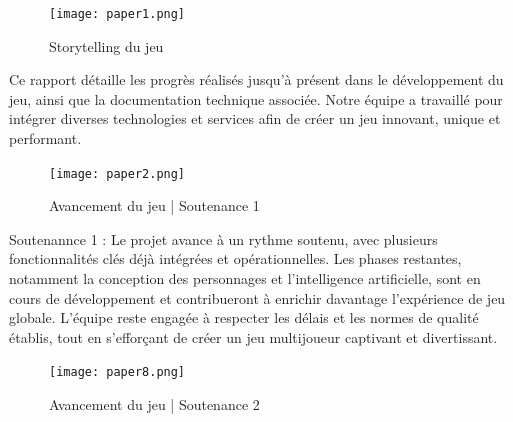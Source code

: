 \documentclass[
	article,			%
	11pt,				%
	oneside,			%
	a4paper,			%
	chapter=TITLE,
	french,			%
	sumario=tradicional
	]{base_nt}
\begin{document}

\frenchspacing 


%
%
\maketitle

\newpage
\vspace{0cm}
\begin{figure}[ht]
	\caption{Storytelling du jeu}
	\centering
	\texttt{[image: paper1.png]}
	
\end{figure}

Ce rapport détaille les progrès réalisés jusqu'à présent dans le développement du jeu, ainsi que la documentation technique associée. Notre équipe a travaillé pour intégrer diverses technologies et services afin de créer un jeu innovant, unique et performant.

\vspace{0cm}
\begin{figure}[ht]
	\caption{Avancement du jeu | Soutenance 1}
	\centering
	\texttt{[image: paper2.png]}
	
\end{figure}

Soutenannce 1 : Le projet avance à un rythme soutenu, avec plusieurs fonctionnalités clés déjà intégrées et opérationnelles. Les phases restantes, notamment la conception des personnages et l'intelligence artificielle, sont en cours de développement et contribueront à enrichir davantage l'expérience de jeu globale. L'équipe reste engagée à respecter les délais et les normes de qualité établis, tout en s'efforçant de créer un jeu multijoueur captivant et divertissant.

\vspace{0cm}
\begin{figure}[ht]
	\caption{Avancement du jeu | Soutenance 2}
	\centering
	\texttt{[image: paper8.png]}
	
\end{figure}
\end{document}
